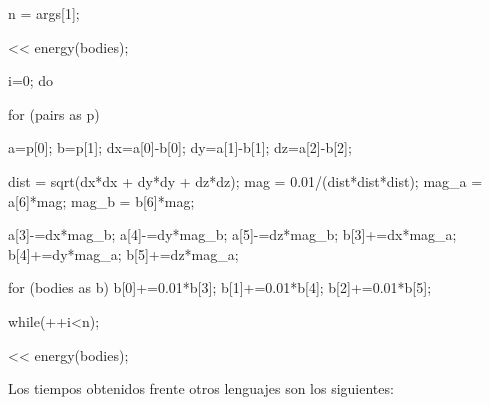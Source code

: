 \begin{myverbatim}
n = args[1];

<< energy(bodies);

i=0; 
do {
   for (pairs as p) {
      a=p[0]; b=p[1];
      dx=a[0]-b[0]; dy=a[1]-b[1]; dz=a[2]-b[2];

      dist = sqrt(dx*dx + dy*dy + dz*dz);
      mag = 0.01/(dist*dist*dist);
      mag_a = a[6]*mag; mag_b = b[6]*mag;
	
      a[3]-=dx*mag_b; a[4]-=dy*mag_b; a[5]-=dz*mag_b;
      b[3]+=dx*mag_a; b[4]+=dy*mag_a; b[5]+=dz*mag_a;
    } 

    for (bodies as b) {
        b[0]+=0.01*b[3]; b[1]+=0.01*b[4]; b[2]+=0.01*b[5];
    } 

} while(++i<n);

<< energy(bodies);
\end{myverbatim}

Los tiempos obtenidos frente otros lenguajes son los siguientes: 

